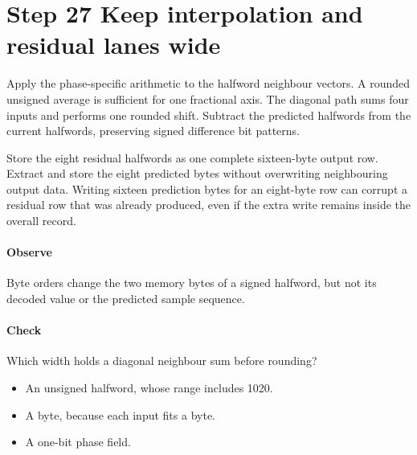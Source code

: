\section{Step 27 Keep interpolation and residual lanes wide}\label{h263-prediction-s07}
Apply the phase-specific arithmetic to the halfword neighbour vectors. A rounded
unsigned average is sufficient for one fractional axis. The diagonal path sums
four inputs and performs one rounded shift. Subtract the predicted halfwords
from the current halfwords, preserving signed difference bit patterns.

Store the eight residual halfwords as one complete sixteen-byte output row.
Extract and store the eight predicted bytes without overwriting neighbouring
output data. Writing sixteen prediction bytes for an eight-byte row can corrupt
a residual row that was already produced, even if the extra write remains inside
the overall record.

\paragraph{Observe} Byte orders change the two memory bytes of a signed
halfword, but not its decoded value or the predicted sample sequence.
\paragraph{Check} Which width holds a diagonal neighbour sum before rounding?
\begin{itemize}
  \item[A.] An unsigned halfword, whose range includes 1020.
  \item[B.] A byte, because each input fits a byte.
  \item[C.] A one-bit phase field.
\end{itemize}
